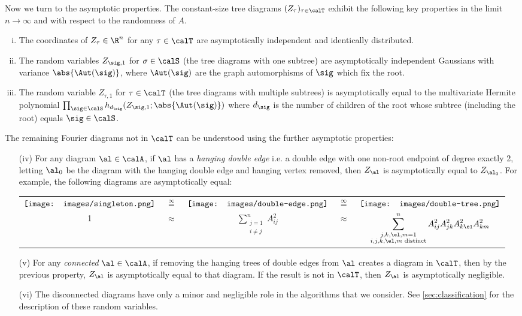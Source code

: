 \documentclass[12pt]{article}
\newcommand{\eqinf}{\,\overset{\infty}{=}\,}
\begin{document}
Now we turn to the asymptotic properties.
The constant-size tree diagrams $(Z_\tau)_{\tau \in \calT}$ exhibit the following key
properties in the limit $n \to \infty$ and with respect to the randomness of $A$.
\begin{enumerate}[(i)]
    \item The coordinates of $Z_\tau\in \R^n$ for any $\tau\in\calT$ are asymptotically independent and identically distributed.
    \item The random variables $Z_{\sig,1}$ for $\sigma \in \calS$ (the tree diagrams with one subtree) are asymptotically independent Gaussians
    with variance $\abs{\Aut(\sig)}$, where $\Aut(\sig)$ are
    the graph automorphisms of $\sig$ which fix the root.
    \item 
    The random variable $Z_{\tau, 1}$ for $\tau \in \calT$ (the tree diagrams with multiple subtrees) is asymptotically equal to the multivariate Hermite polynomial $\prod_{\sig \in \calS} h_{d_\sig}(Z_{\sig,1}; \abs{\Aut(\sig)})$
    where $d_\sig$ is the number of children of the root whose subtree (including the root) equals $\sig \in \calS$.
\end{enumerate}
\noindent
The remaining Fourier diagrams not in $\calT$ can be understood using the further asymptotic properties:

\begin{itemize}
    \item[(iv)] For any diagram $\al \in \calA$, if $\al$ has a \emph{hanging double edge} i.e. a double edge with one non-root endpoint of degree exactly 2,
    letting $\al_0$ be the diagram with the hanging double edge and hanging vertex removed,
    then $Z_{\al}$ is asymptotically equal to $Z_{\al_0}$.
    For example, the following diagrams are asymptotically equal:
    \begin{center}
    \begin{tabular}{ccccc}
         $\vcenter{\hbox{\texttt{[image: images/singleton.png]}}}$ &  $\eqinf$ & $\vcenter{\hbox{\texttt{[image: images/double-edge.png]}}}$ & $\eqinf$ & $\vcenter{\hbox{\texttt{[image: images/double-tree.png]}}}$\\
         1 & $\approx$ &  $\displaystyle\sum_{\substack{j=1\\i \neq j}}^n A_{ij}^2$ & $\approx$ & $\displaystyle\sum_{\substack{j,k,\el,m = 1\\i,j,k,\el,m\text{ distinct}}}^n A_{ij}^2 A_{jk}^2 A_{k\el}^2 A_{km}^2$
    \end{tabular}
    \end{center}

    \item[(v)] For any \emph{connected} $\al \in \calA$, if removing the hanging trees of double
    edges from $\al$ creates a diagram in $\calT$, then by the previous property, 
    $Z_\al$ is asymptotically equal to that diagram.
    If the result is not in $\calT$, then $Z_\al$ is asymptotically negligible.
    \item[(vi)]
    The disconnected diagrams have only a minor and negligible role in the algorithms that we consider.
    See \cref{sec:classification} for the description
    of these random variables.
\end{itemize}
\end{document}
